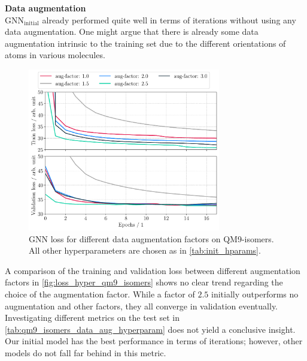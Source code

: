 \textbf{Data augmentation}\\
$\text{GNN}_\text{initial}$ already performed quite well in terms of iterations without using any data augmentation. One might argue that there is already some data augmentation intrinsic to the training set due to the different orientations of atoms in various molecules. 
\begin{figure}[H]
    \centering
    \includegraphics[width=0.75\textwidth]{../fig/application/aug_train_val_loss.pdf}
    \caption[GNN loss for different augmentation factors on QM9-isomers]{GNN loss for different data augmentation factors on QM9-isomers. All other hyperparameters are chosen as in \autoref{tab:init_hparams}.}
    \label{fig:loss_hyper_qm9_isomers}
\end{figure}
A comparison of the training and validation loss between different augmentation factors in \autoref{fig:loss_hyper_qm9_isomers} shows no clear trend regarding the choice of the augmentation factor. While a factor of $2.5$ initially outperforms no augmentation and other factors, they all converge in validation eventually. 
Investigating different metrics on the test set in \autoref{tab:qm9_isomers_data_aug_hyperparam} does not yield a conclusive insight. Our initial model has the best performance in terms of iterations; however, other models do not fall far behind in this metric.
